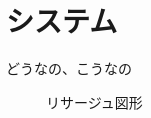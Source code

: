 \chapter{システム}\label{chap:system}

どうなの、こうなの

\begin{figure}[th]
\begin{center}
\caption{リサージュ図形}
\end{center}
\label{fig:lissajous}
\end{figure}


\newpage

